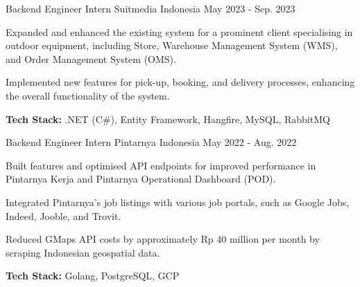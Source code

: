 \begin{cventries}
  \cventry
    {Backend Engineer Intern} %
    {Suitmedia} %
    {Indonesia} %
    {May 2023 - Sep. 2023} %
    {
      \begin{cvitems} %
        \item {Expanded and enhanced the existing system for a prominent client specialising in outdoor equipment, including Store, Warehouse Management System (WMS), and Order Management System (OMS).}
        \item {Implemented new features for pick-up, booking, and delivery processes, enhancing the overall functionality of the system.}
        \item {\textbf{Tech Stack:} .NET (C\#), Entity Framework, Hangfire, MySQL, RabbitMQ}
      \end{cvitems}
    }

  \cventry
    {Backend Engineer Intern} %
    {Pintarnya} %
    {Indonesia} %
    {May 2022 - Aug. 2022} %
    {
      \begin{cvitems} %
        \item {Built features and optimised API endpoints for improved performance in Pintarnya Kerja and Pintarnya Operational Dashboard (POD).}
        \item {Integrated Pintarnya's job listings with various job portals, such as Google Jobs, Indeed, Jooble, and Trovit.}
        \item {Reduced GMaps API costs by approximately Rp 40 million per month by scraping Indonesian geospatial data.}
        \item {\textbf{Tech Stack:} Golang, PostgreSQL, GCP}
      \end{cvitems}
    }

\end{cventries}